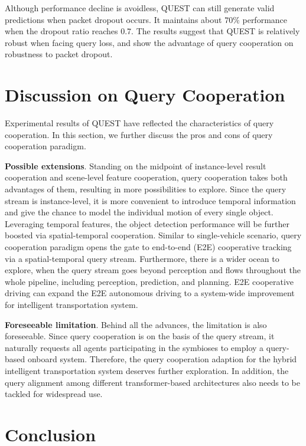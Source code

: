 \documentclass[letterpaper, 10 pt, conference]{ieeeconf}  %
\begin{document}
Although performance decline is avoidless, QUEST can still generate valid predictions when packet dropout occurs. It maintains about $70\%$ performance when the dropout ratio reaches 0.7. The results suggest that QUEST is relatively robust when facing query loss, and show the advantage of query cooperation on robustness to packet dropout.

\section{Discussion on Query Cooperation}

Experimental results of QUEST have reflected the characteristics of query cooperation. In this section, we further discuss the pros and cons of query cooperation paradigm.

\textbf{Possible extensions}. Standing on the midpoint of instance-level result cooperation and scene-level feature cooperation, query cooperation takes both advantages of them, resulting in more possibilities to explore. Since the query stream is instance-level, it is more convenient to introduce temporal information and give the chance to model the individual motion of every single object. Leveraging temporal features, the object detection performance will be further boosted via spatial-temporal cooperation. Similar to single-vehicle scenario, query cooperation paradigm opens the gate to end-to-end (E2E) cooperative tracking via a spatial-temporal query stream. Furthermore, there is a wider ocean to explore, when the query stream goes beyond perception and flows throughout the whole pipeline, including perception, prediction, and planning. E2E cooperative driving can expand the E2E autonomous driving \cite{uniad} to a system-wide improvement for intelligent transportation system.

\textbf{Foreseeable limitation}. Behind all the advances, the limitation is also foreseeable. Since query cooperation is on the basis of the query stream, it naturally requests all agents participating in the symbioses to employ a query-based onboard system. Therefore, the query cooperation adaption for the hybrid intelligent transportation system deserves further exploration. In addition, the query alignment among different transformer-based architectures also needs to be tackled for widespread use. 

\section{Conclusion}
\end{document}
